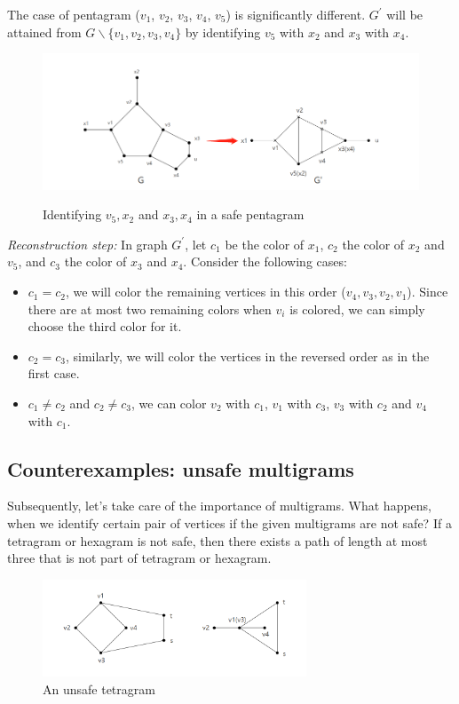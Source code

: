 The case of pentagram ($v_1$, $v_2$, $v_3$, $v_4$, $v_5$) is significantly different. $G^{'}$ will be attained from $G \backslash \{v_1, v_2, v_3, v_4\}$ by identifying $v_5$ with $x_2$ and $x_3$ with $x_4$.

\begin{figure}[H] %
\centering %
\includegraphics[width=1.1\textwidth]{figure/pentagramidentift.png} 
\label{figure} %
\caption{Identifying $v_5, x_2$ and $x_3, x_4$ in a safe pentagram}
\end{figure}

\textit{Reconstruction step: }In graph $G^{'}$, let $c_1$ be the color of $x_1$, $c_2$ the color of $x_2$ and $v_5$, and $c_3$ the color of $x_3$ and $x_4$. Consider the following cases:
\begin{itemize}
    \item $c_1 = c_2$, we will color the remaining vertices in this order ($v_4, v_3, v_2, v_1$). Since there are at most two remaining colors when $v_i$ is colored, we can simply choose the third color for it. 
    \item $c_2 = c_3$, similarly, we will color the vertices in the reversed order as in the first case.
    \item $c_1 \ne c_2$ and $c_2 \ne c_3$, we can color $v_2$ with $c_1$, $v_1$ with $c_3$, $v_3$ with $c_2$ and $v_4$ with $c_1$.
\end{itemize}

\subsection{Counterexamples: unsafe multigrams}
Subsequently, let's take care of the importance of multigrams. What happens, when we identify certain pair of vertices if the given multigrams are not safe? If a tetragram or hexagram is not safe, then there exists a path of length at most three that is not part of tetragram or hexagram.
\begin{figure}[H] %
\centering %
\includegraphics[width=0.7\textwidth]{figure/unsafetetragram.png} 
\caption{An unsafe tetragram} %
\label{figure} %
\end{figure}

